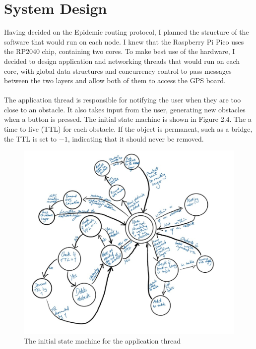 \documentclass[12pt,a4paper]{report}
\begin{document}
\section{System Design}
Having decided on the Epidemic routing protocol, I planned the structure of the software that would run on each node. I knew that the Raspberry Pi Pico uses the RP2040 chip, containing two cores. To make best use of the hardware, I decided to design application and networking threads that would run on each core, with global data structures and concurrency control to pass messages between the two layers and allow both of them to access the GPS board. \\ \\
The application thread is responsible for notifying the user when they are too close to an obstacle. It also takes input from the user, generating new obstacles when a button is pressed. The initial state machine is shown in Figure 2.4. The a time to live (TTL) for each obstacle. If the object is permanent, such as a bridge, the TTL is set to $-1$, indicating that it should never be removed.
\begin{figure}[h]
\begin{center}
\includegraphics[scale=0.5]{appThread.jpg}
\caption{The initial state machine for the application thread}
\end{center}
\end{figure}
\end{document}
